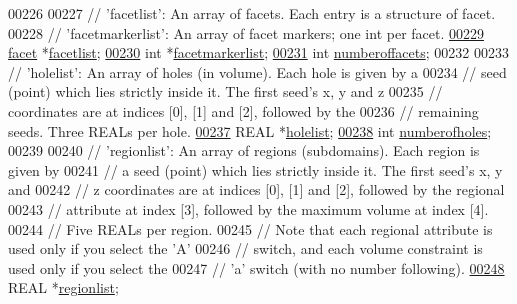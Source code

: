 \begin{DoxyCode}
00226 
00227   \textcolor{comment}{// 'facetlist':  An array of facets.  Each entry is a structure of facet.}
00228   \textcolor{comment}{// 'facetmarkerlist':  An array of facet markers; one int per facet.}
\hypertarget{tetgen_8h_source.tex_l00229}{}\hyperlink{classtetgenio_ad65489b9aece6ba14ff8e3c89f533ced}{00229}   \hyperlink{structtetgenio_1_1facet}{facet} *\hyperlink{classtetgenio_ad65489b9aece6ba14ff8e3c89f533ced}{facetlist};
\hypertarget{tetgen_8h_source.tex_l00230}{}\hyperlink{classtetgenio_a0d5d9d0718980f8e9d4ecc3e771abba0}{00230}   \textcolor{keywordtype}{int} *\hyperlink{classtetgenio_a0d5d9d0718980f8e9d4ecc3e771abba0}{facetmarkerlist};
\hypertarget{tetgen_8h_source.tex_l00231}{}\hyperlink{classtetgenio_af1cb1515751c9cd0497abba62da8790d}{00231}   \textcolor{keywordtype}{int} \hyperlink{classtetgenio_af1cb1515751c9cd0497abba62da8790d}{numberoffacets};
00232 
00233   \textcolor{comment}{// 'holelist':  An array of holes (in volume).  Each hole is given by a}
00234   \textcolor{comment}{//   seed (point) which lies strictly inside it. The first seed's x, y and z}
00235   \textcolor{comment}{//   coordinates are at indices [0], [1] and [2], followed by the}
00236   \textcolor{comment}{//   remaining seeds.  Three REALs per hole. }
\hypertarget{tetgen_8h_source.tex_l00237}{}\hyperlink{classtetgenio_a395bd7fc3f66dd013efd5176a0d54265}{00237}   REAL *\hyperlink{classtetgenio_a395bd7fc3f66dd013efd5176a0d54265}{holelist};
\hypertarget{tetgen_8h_source.tex_l00238}{}\hyperlink{classtetgenio_ad12a46036cd44a7a646228d5471b51ac}{00238}   \textcolor{keywordtype}{int} \hyperlink{classtetgenio_ad12a46036cd44a7a646228d5471b51ac}{numberofholes};
00239 
00240   \textcolor{comment}{// 'regionlist': An array of regions (subdomains).  Each region is given by}
00241   \textcolor{comment}{//   a seed (point) which lies strictly inside it. The first seed's x, y and}
00242   \textcolor{comment}{//   z coordinates are at indices [0], [1] and [2], followed by the regional}
00243   \textcolor{comment}{//   attribute at index [3], followed by the maximum volume at index [4]. }
00244   \textcolor{comment}{//   Five REALs per region.}
00245   \textcolor{comment}{// Note that each regional attribute is used only if you select the 'A'}
00246   \textcolor{comment}{//   switch, and each volume constraint is used only if you select the}
00247   \textcolor{comment}{//   'a' switch (with no number following).}
\hypertarget{tetgen_8h_source.tex_l00248}{}\hyperlink{classtetgenio_a74b5593324c79ad60d9bb0951afb2b41}{00248}   REAL *\hyperlink{classtetgenio_a74b5593324c79ad60d9bb0951afb2b41}{regionlist};

\end{DoxyCode}
